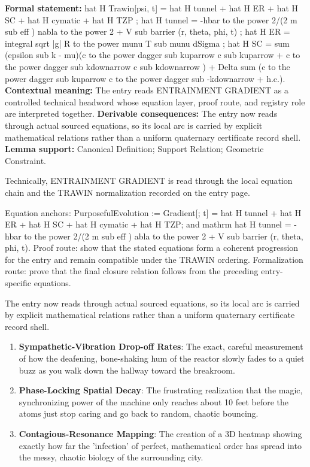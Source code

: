 \begingroup\footnotesize\setlength{\emergencystretch}{3em}\sloppy
\textbf{Formal statement:} hat H Trawin[psi, t] = hat H tunnel + hat H ER + hat H SC + hat H cymatic + hat H TZP ; hat H tunnel = -hbar to the power 2/(2 m sub eff ) nabla to the power 2 + V sub barrier (r, theta, phi, t) ; hat H ER = integral sqrt |g| R to the power munu T sub munu dSigma ; hat H SC = sum (epsilon sub k - mu)(c to the power dagger sub kuparrow c sub kuparrow + c to the power dagger sub kdownarrow c sub kdownarrow ) + Delta sum (c to the power dagger sub kuparrow c to the power dagger sub -kdownarrow + h.c.). \textbf{Contextual meaning:} The entry reads ENTRAINMENT GRADIENT as a controlled technical headword whose equation layer, proof route, and registry role are interpreted together. \textbf{Derivable consequences:} The entry now reads through actual sourced equations, so its local arc is carried by explicit mathematical relations rather than a uniform quaternary certificate record shell. \textbf{Lemma support:} Canonical Definition; Support Relation; Geometric Constraint.\par
\endgroup

Technically, ENTRAINMENT GRADIENT is read through the local equation chain and the TRAWIN normalization recorded on the entry page.

Equation anchors: PurposefulEvolution := Gradient[; t] = hat H tunnel + hat H ER + hat H SC + hat H cymatic + hat H TZP; and mathrm hat H tunnel = -hbar to the power 2/(2 m sub eff ) abla to the power 2 + V sub barrier (r, theta, phi, t). Proof route: show that the stated equations form a coherent progression for the entry and remain compatible under the TRAWIN ordering. Formalization route: prove that the final closure relation follows from the preceding entry-specific equations.

The entry now reads through actual sourced equations, so its local arc is carried by explicit mathematical relations rather than a uniform quaternary certificate record shell.
\endgroup

\begin{enumerate}[leftmargin=1.6em,itemsep=6pt,topsep=4pt]
\item \textbf{Sympathetic-Vibration Drop-off Rates}: The exact, careful measurement of how the deafening, bone-shaking hum of the reactor slowly fades to a quiet buzz as you walk down the hallway toward the breakroom.
\item \textbf{Phase-Locking Spatial Decay}: The frustrating realization that the magic, synchronizing power of the machine only reaches about 10 feet before the atoms just stop caring and go back to random, chaotic bouncing.
\item \textbf{Contagious-Resonance Mapping}: The creation of a 3D heatmap showing exactly how far the 'infection' of perfect, mathematical order has spread into the messy, chaotic biology of the surrounding city.
\end{enumerate}

